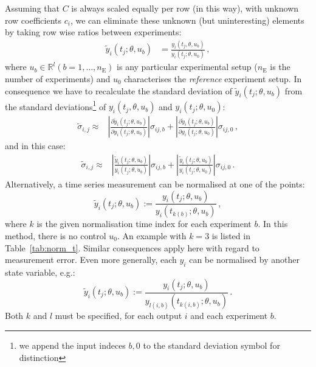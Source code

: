 \documentclass[utf8,english]{scrartcl}
\begin{document}
Assuming that $C$ is always scaled equally per row (in this way),
 with unknown row coefficients $c_i$, we can eliminate these unknown
(but uninteresting) elements by taking row wise ratios between experiments:
\begin{align}
  \tilde y_i(t_j;\theta,u_b) &=
  \frac{y_i(t_j,\theta,u_b)}{y_i(t_j;\theta,u_0)}\,,
\end{align}
where $u_b\in\mathbb{R}^l (b=1,\dots,n_{\text{E}})$ is any particular
experimental setup ($n_{\text{E}}$ is the number of experiments) and
$u_0$ characterises the \emph{reference} experiment setup.  In
consequence we have to recalculate the standard deviation of $\tilde
y_i(t_j;\theta,u_b)$ from the standard deviations\footnote{we append
  the input indeces $b,0$ to the standard deviation symbol for
  distinction} of ${y_i(t_j,\theta,u_b)}$ and ${y_i(t_j;\theta,u_0)}$:
\begin{align}
  \label{eq:std_y}
  \tilde\sigma_{i,j}\approx&\left|\frac{\partial\tilde
      y_i(t_j;\theta,u_b)}{\partial
      y_i(t_j;\theta,u_b)}\right|\sigma_{ij,b} +
  \left|\frac{\partial\tilde y_i(t_j;\theta,u_b)}{\partial
      y_i(t_j;\theta,u_0)}\right|\sigma_{ij,0}\,,
\end{align}
and in this case:
\begin{align}
  \label{eq:std_yy}
  \tilde\sigma_{i,j}\approx&\left|\frac{\tilde
      y_i(t_j;\theta,u_b)}{y_i(t_j;\theta,u_b)}\right|\sigma_{ij,b} +
  \left|\frac{\tilde
      y_i(t_j;\theta,u_b)}{y_i(t_j;\theta,u_0)}\right|\sigma_{ij,0}\,.
\end{align}
Alternatively, a time series measurement can be normalised at one of
the points:
\begin{equation}
  \label{eq:norm_t}
  \tilde y_i(t_j;\theta,u_b):=\frac{y_i(t_j;\theta,u_b)}{y_i(t_{k(b)};\theta,u_b)}\,,
\end{equation}
where $k$ is the given normalisation time index for each experiment
$b$. In this method, there is no control $u_0$. An example with $k=3$ is listed in Table~\ref{tab:norm_t}. Similar consequences apply here with regard to measurement error. Even more generally, each $y_i$ can be normalised by another state variable, e.g.:
\begin{equation}
  \label{eq:norm_ft}
  \tilde y_i(t_j;\theta,u_b):=\frac{y_i(t_j;\theta,u_b)}{y_{l(i,b)}(t_{k(i,b)};\theta,u_b)}\,.
\end{equation}
Both $k$ and $l$ must be specified, for each output $i$ and each
experiment $b$.
\end{document}
